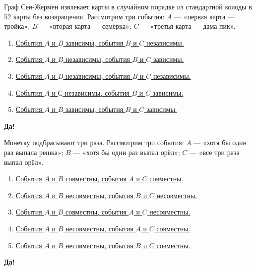 \documentclass[t]{beamer}
\begin{document}
 \begin{frame} \label{1-Yes} 
\begin{block}{1} 

  Граф Сен-Жермен извлекает карты в случайном порядке из стандартной колоды в 52 карты без возвращения. Рассмотрим три события: $A$ — «первая карта — тройка»; $B$ — «вторая карта — семёрка»; $C$ — «третья карта — дама пик».
  


 \end{block} 
\begin{enumerate} 
\item[] \hyperlink{1-No}{\beamergotobutton{} События $A$ и $B$ зависимы, события $B$ и $C$ независимы.}
\item[] \hyperlink{1-No}{\beamergotobutton{} События $A$ и $B$ независимы, события $B$ и $C$ зависимы.}
\item[] \hyperlink{1-No}{\beamergotobutton{} События $A$ и $B$ независимы, события $B$ и $C$ независимы.}
\item[] \hyperlink{1-No}{\beamergotobutton{} События $A$ и $С$ независимы, события $B$ и $C$ зависимы.}
\item[] \hyperlink{1-Yes}{\beamergotobutton{} События $A$ и $B$ зависимы, события $B$ и $C$ зависимы.}
\end{enumerate} 

 \textbf{Да!} 
 \hyperlink{2}{}\end{frame} 


 \begin{frame} \label{2-Yes} 
\begin{block}{2} 

Монетку подбрасывают три раза. Рассмотрим три события: $A$ — «хотя бы один раз выпала решка»; $B$ — «хотя бы один раз выпал орёл»; $C$ — «все три раза выпал орёл».
  


 \end{block} 
\begin{enumerate} 
\item[] \hyperlink{2-No}{\beamergotobutton{} События $A$ и $B$ совместны, события $A$ и $C$ совместны.}
\item[] \hyperlink{2-No}{\beamergotobutton{} События $A$ и $B$ несовместны, события $B$ и $C$ несовместны.}
\item[] \hyperlink{2-Yes}{\beamergotobutton{} События $A$ и $B$ совместны, события $A$ и $C$ несовместны.}
\item[] \hyperlink{2-No}{\beamergotobutton{} События $A$ и $B$ несовместны, события $A$ и $C$ совместны.}
\item[] \hyperlink{2-No}{\beamergotobutton{} События $A$ и $B$ несовместны, события $B$ и $C$ совместны.}
\end{enumerate} 

 \textbf{Да!} 
 \hyperlink{3}{}\end{frame} 
\end{document}
